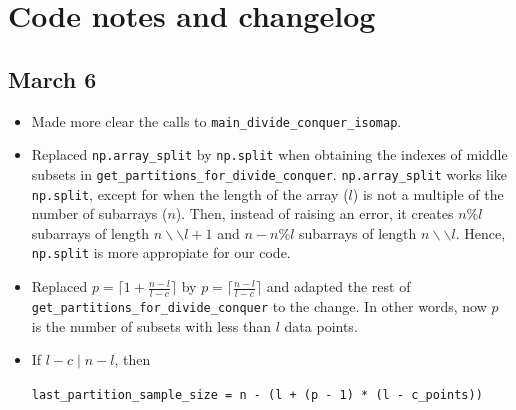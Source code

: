 \documentclass[a4paper,12pt]{article}
\begin{document}
\pagebreak
\section{Code notes and changelog}

\subsection{March 6}

\begin{itemize}
    \item Made more clear the calls to \verb|main_divide_conquer_isomap|.
    \item Replaced \texttt{np.array\_split} by \texttt{np.split} when obtaining the indexes of middle subsets in \nolinkurl{get\_partitions\_for\_divide\_conquer}. \texttt{np.array\_split} works like \texttt{np.split}, except for when the length of the array ($l$) is not a multiple of the number of subarrays ($n$). Then, instead of raising an error, it creates $n\% l$ subarrays of length $n\backslash\backslash l+1$ and $n-n\% l$ subarrays of length $n\backslash\backslash l$. Hence, \texttt{np.split} is more appropiate for our code.
    \item Replaced $p=\lceil 1 + \frac{n-l}{l-c} \rceil$ by $p=\lceil \frac{n-l}{l-c} \rceil$ and adapted the rest of \nolinkurl{get\_partitions\_for\_divide\_conquer} to the change. In other words, now $p$ is the number of subsets with less than $l$ data points.
    \item If $l-c \mid n-l$, then
    
    \verb|last_partition_sample_size = n - (l + (p - 1) * (l - c_points))|


\end{itemize}
\end{document}

